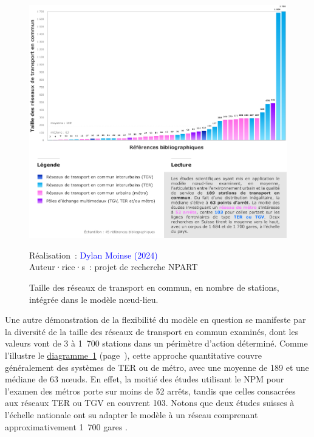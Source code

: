 \begin{refsegment}
    \begin{figure}[h!]\vspace*{4pt}
        \caption{Taille des réseaux de transport en commun, en nombre de stations, intégrée dans le modèle nœud-lieu.}
        \label{fig-chap6:taille-reseaux-TC}
        \centerline{\includegraphics[width=1\columnwidth]{src/Figures/Chap-6/FR_NPART_Taille_reseaux_TC.pdf}}
        \vspace{5pt}
        \begin{flushright}\scriptsize{
        Réalisation~: \textcolor{blue}{Dylan Moinse (2024)}
        \\
        Auteur·rice·s~: projet de recherche \acrshort{NPART}
        }\end{flushright}
    \end{figure}

Une autre démonstration de la flexibilité du modèle en question se manifeste par la diversité de la taille des réseaux de transport en commun examinés, dont les valeurs vont de 3 à 1~700 stations dans un périmètre d'action déterminé. Comme l'illustre le \hyperref[fig-chap6:taille-reseaux-TC]{diagramme~\ref{fig-chap6:taille-reseaux-TC}} (page~\pageref{fig-chap6:taille-reseaux-TC}), cette approche quantitative couvre généralement des systèmes de \acrfull{TER} ou de métro, avec une moyenne de 189 et une médiane de 63 nœuds. En effet, la moitié des études utilisant le \acrshort{NPM} pour l'examen des métros porte sur moins de 52 arrêts, tandis que celles consacrées aux réseaux \acrshort{TER} ou \acrshort{TGV} en couvrent 103. Notons que deux études suisses à l'échelle nationale ont su adapter le modèle à un réseau comprenant approximativement 1~700 gares \textcolor{blue}{\autocites[194]{reusser_classifying_2008}[672]{zemp_classifying_2011}}.%


\end{refsegment}
